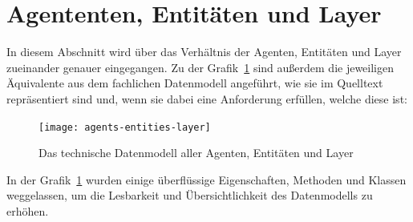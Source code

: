 %


\section{Agententen, Entitäten und Layer}\label{sec:agents-entities-layers}

In diesem Abschnitt wird über das Verhältnis der Agenten, Entitäten und Layer zueinander genauer eingegangen.
Zu der Grafik~\ref{fig:agents-entities-layer} sind außerdem die jeweiligen Äquivalente aus dem fachlichen Datenmodell angeführt, wie sie im Quelltext repräsentiert sind und, wenn sie dabei eine Anforderung erfüllen, welche diese ist:

\begin{figure}[h]
    \centering
    \texttt{[image: agents-entities-layer]}~\caption{Das technische Datenmodell aller Agenten, Entitäten und Layer}
    \label{fig:agents-entities-layer}
\end{figure}

In der Grafik~\ref{fig:agents-entities-layer} wurden einige überflüssige Eigenschaften, Methoden und Klassen weggelassen, um die Lesbarkeit und Übersichtlichkeit des Datenmodells zu erhöhen.

